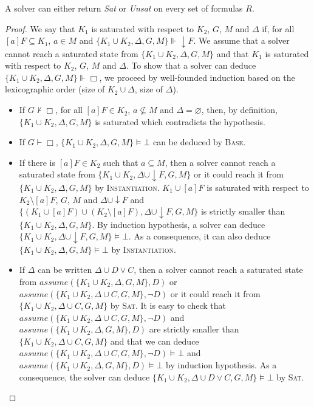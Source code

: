 \documentclass[a4paper,11pt]{article}
\newcommand{\A}{\mathit{assume}}
\newcommand{\impbox}{\vDash\bot}
\begin{document}
{\theorem\label{comp} A solver can either return \emph{Sat} or \emph{Unsat} on every set of formulas $R$.}
\begin{proof}
We say that $K_1$ is saturated with respect to $K_2$, $G$, $M$ and $\Delta$ if, for all $[a]F\subseteq K_1$,
$a\in M$ and $\{K_1\cup K_2,\Delta,G,M\}\Vdash\downarrow F$.
We assume that a solver cannot reach a saturated state from
$\{K_1\cup K_2,\Delta,G,M\}$ and that $K_1$ is saturated with respect to $K_2$, $G$, $M$ and $\Delta$.
To show that a solver can deduce $\{K_1\cup K_2,\Delta,G,M\}\Vdash\Box$,
we proceed by well-founded induction based on the lexicographic order (size of $K_2\cup \Delta$,
size of $\Delta$).
\begin{itemize}
 \item If $G\nvdash\Box$, for all $[a]F\in K_2$, $a\nsubseteq M$ and $\Delta=\varnothing$,
then, by definition,  $\{K_1\cup K_2,\Delta,G,M\}$ is saturated which contradicts the hypothesis.
 \item If $G\vdash\Box$, $\{K_1\cup K_2,\Delta,G,M\}\impbox$ can be deduced by \textsc{Base}.
 \item If there is $[a]F\in K_2$ such that $a\subseteq M$, then a solver
cannot reach a saturated state from $\{K_1\cup K_2,\Delta\cup\downarrow F,G,M\}$ or it could
reach it from $\{K_1\cup K_2,\Delta,G,M\}$ by \textsc{Instantiation}.
$K_1\cup [a]F$ is saturated with respect to $K_2\setminus[a]F$, $G$, $M$ and $\Delta\cup\downarrow F$
and $\{(K_1\cup [a]F)\cup(K_2\setminus[a]F),\Delta\cup\downarrow F,G,M\}$ is strictly smaller than
$\{K_1\cup K_2,\Delta,G,M\}$. By induction hypothesis,
a solver can deduce $\{K_1\cup K_2,\Delta\cup\downarrow F,G,M\}\impbox$.
As a consequence, it can also deduce $\{K_1\cup K_2,\Delta,G,M\}\impbox$ by \textsc{Instantiation}.
 \item If $\Delta$ can be written $\Delta\cup D\vee C$, then a solver
cannot reach a saturated state from $\A(\{K_1\cup K_2,\Delta,G,M\},D)$ or
$\A(\{K_1\cup K_2,\Delta\cup C,G,M\},\neg D)$ or it could
reach it from $\{K_1\cup K_2,\Delta\cup C,G,M\}$ by \textsc{Sat}.
It is easy to check that $\A(\{K_1\cup K_2,\Delta\cup C,G,M\},\neg D)$ and
$\A(\{K_1\cup K_2,\Delta,G,M\},D)$ are strictly smaller than $\{K_1\cup K_2,\Delta\cup C,G,M\}$
and that we can deduce $\A(\{K_1\cup K_2,\Delta\cup C,G,M\},\neg D)\impbox$ and
$\A(\{K_1\cup K_2,\Delta,G,M\},D)\impbox$ by induction hypothesis.
As a consequence, the solver can deduce $\{K_1\cup K_2,\Delta\cup D\vee C,G,M\}\impbox$ by \textsc{Sat}.
\end{itemize}
\end{proof}
\end{document}
